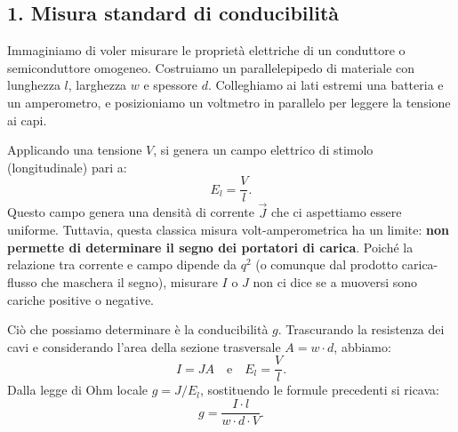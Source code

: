 \documentclass{book}
\begin{document}
\subsection*{1. Misura standard di conducibilità}
Immaginiamo di voler misurare le proprietà elettriche di un conduttore o semiconduttore omogeneo. Costruiamo un parallelepipedo di materiale con lunghezza \(l\), larghezza \(w\) e spessore \(d\).
Colleghiamo ai lati estremi una batteria e un amperometro, e posizioniamo un voltmetro in parallelo per leggere la tensione ai capi.

Applicando una tensione \(V\), si genera un campo elettrico di stimolo (longitudinale) pari a:
\[
E_l = \frac{V}{l}.
\]
Questo campo genera una densità di corrente \(\vec{J}\) che ci aspettiamo essere uniforme.
Tuttavia, questa classica misura volt-amperometrica ha un limite: \textbf{non permette di determinare il segno dei portatori di carica}. Poiché la relazione tra corrente e campo dipende da \(q^2\) (o comunque dal prodotto carica-flusso che maschera il segno), misurare \(I\) o \(J\) non ci dice se a muoversi sono cariche positive o negative.

Ciò che possiamo determinare è la conducibilità \(g\). Trascurando la resistenza dei cavi e considerando l'area della sezione trasversale \(A = w \cdot d\), abbiamo:
\[
I = J A \quad \text{e} \quad E_l = \frac{V}{l}.
\]
Dalla legge di Ohm locale \(g = J / E_l\), sostituendo le formule precedenti si ricava:
\[
g = \frac{I \cdot l}{w \cdot d \cdot V}.
\]
\end{document}
